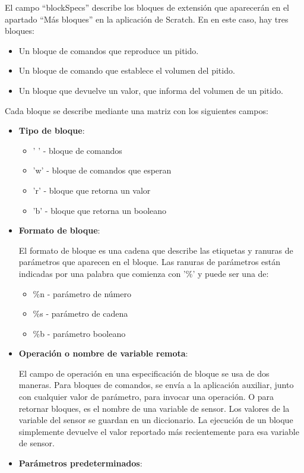 El campo ``blockSpecs'' describe los bloques de extensión que aparecerán en el apartado ``Más bloques'' en la aplicación de Scratch.
En en este caso, hay tres bloques:
\begin{itemize}
\item Un bloque de comandos que reproduce un pitido.
\item Un bloque de comando que
establece el volumen del pitido.
\item Un bloque que devuelve un valor, que informa del volumen de un pitido.
\end{itemize}

Cada bloque se describe mediante una matriz con los siguientes campos:
\begin{itemize}
\item \textbf{Tipo de bloque}:

\begin{itemize}
\item ' ' - bloque de comandos
\item 'w' - bloque de comandos que esperan
\item 'r' - bloque que retorna un valor
\item 'b' - bloque que retorna un booleano 
\end{itemize}
\item \textbf{Formato de bloque}:

El formato de bloque es una cadena que describe las etiquetas y ranuras de parámetros que aparecen en el bloque.
Las ranuras de parámetros están indicadas por una palabra que comienza con '\%' y puede ser una de:
\begin{itemize}
\item \%n -  parámetro de número 
\item \%s - parámetro de cadena 
\item \%b - parámetro booleano
\end{itemize}
\item \textbf{Operación o nombre de variable remota}:

El campo de operación en una especificación de bloque se usa de dos maneras. Para bloques de comandos, se envía a la aplicación auxiliar, junto con cualquier valor de parámetro, para invocar una operación. O para retornar bloques, es el nombre de una variable de sensor. Los valores de la variable del sensor se guardan en un diccionario. La ejecución de un bloque simplemente devuelve el valor reportado más recientemente para esa variable de sensor.
\item \textbf{Parámetros predeterminados}:


\end{itemize}
